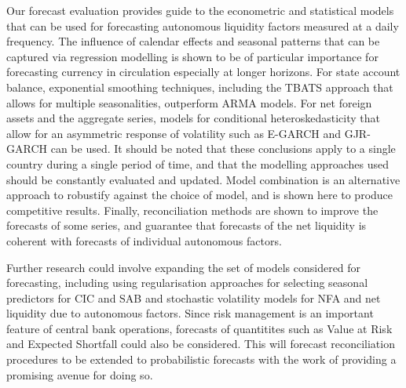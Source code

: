 Our forecast evaluation provides guide to the econometric and statistical models that can be used for forecasting autonomous liquidity factors measured at a daily frequency. The influence of calendar effects and seasonal patterns that can be captured via regression modelling is shown to be of particular importance for forecasting currency in circulation especially at longer horizons. For state account balance, exponential smoothing techniques, including the TBATS approach that allows for multiple seasonalities, outperform ARMA models. For net foreign assets and the aggregate series, models for conditional heteroskedasticity that allow for an asymmetric response of volatility such as E-GARCH and GJR-GARCH can be used. It should be noted that these conclusions apply to a single country during a single period of time, and that the modelling approaches used should be constantly evaluated and updated. Model combination is an alternative approach to robustify against the choice of model, and is shown here to produce competitive results. Finally, reconciliation methods are shown to improve the forecasts of some series, and guarantee that forecasts of the net liquidity is coherent with forecasts of individual autonomous factors.

Further research could involve expanding the set of models considered for forecasting, including using regularisation approaches for selecting seasonal predictors for CIC and SAB and stochastic volatility models for NFA and net liquidity due to autonomous factors. Since risk management is an important feature of central bank operations, forecasts of quantitites such as Value at Risk and Expected Shortfall could also be considered. This will forecast reconciliation procedures to be extended to probabilistic forecasts with the work of \citet{PanEtAl2020} providing a promising avenue for doing so.



